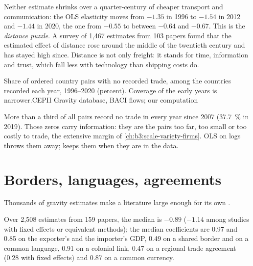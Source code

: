 Neither estimate shrinks over a quarter-century of cheaper transport and
communication: the OLS elasticity moves from $-1.35$ in 1996 to $-1.54$ in 2012 and
$-1.44$ in 2020, the  one from $-0.55$ to between $-0.64$ and $-0.67$. This is the
\emph{distance puzzle}. A survey of 1{,}467 estimates from 103 papers found that the
estimated effect of distance rose around the middle of the twentieth century and
has stayed high since. %
Distance is not only freight: it stands for time, information and trust, which
fall less with technology than shipping costs do.

\begin{omchart}{Share of ordered country pairs with no recorded trade, among the
countries recorded each year, 1996--2020 (percent). Coverage of the early years is
narrower.}{CEPII Gravity database, BACI flows; our computation}
\end{omchart}

More than a third of all pairs record no trade in every year since 2007 (37.7~\% in
2019). Those zeros carry information: they are the pairs too far, too small or
too costly to trade, the extensive margin of \cref{ch:b3:scale-variety-firms}.
OLS on logs throws them away;  keeps them when they are in the data.

\section{Borders, languages, agreements}\label{sec:b3:gravity:effects}

Thousands of gravity estimates make a literature large enough for its own
.

\begin{record}
Over 2{,}508 estimates from 159 papers, the median  is $-0.89$
($-1.14$ among studies with fixed effects or equivalent methods); the median
coefficients are 0.97 and 0.85 on the exporter's and the importer's GDP, 0.49 on a
shared border and on a common language, 0.91 on a colonial link, 0.47 on a
regional trade agreement (0.28 with fixed effects) and 0.87 on a common currency.
\end{record}

